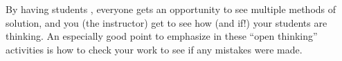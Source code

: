 By having students , everyone gets an opportunity to see multiple methods of solution, and you (the instructor) get to see how (and if!) your students are thinking.  An especially good point to emphasize in these ``open thinking'' activities is how to check your work to see if any mistakes were made.




